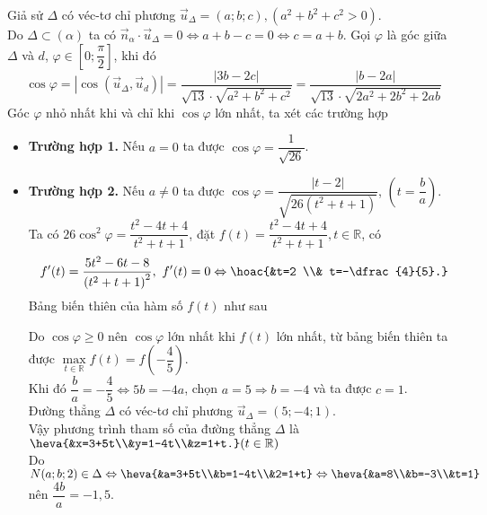 \begin{ex}
{\begin{itemize}
			Giả sử $\Delta$ có véc-tơ chỉ phương $\overrightarrow{u}_{\Delta}=(a ; b ; c),\left(a^2+b^2+c^2>0\right)$.\\
			Do $\Delta \subset(\alpha)$ ta có $\overrightarrow{n}_\alpha \cdot \overrightarrow{u}_{\Delta}=0 \Leftrightarrow a+b-c=0 \Leftrightarrow c=a+b$.
			Gọi $\varphi$ là góc giữa $\Delta$ và $d$, $\varphi \in\left[0 ; \dfrac{\pi}{2}\right]$, khi đó
			$$
			\cos \varphi=\left|\cos \left(\overrightarrow{u}_{\Delta}, \overrightarrow{u}_d\right)\right|=\dfrac{|3 b-2 c|}{\sqrt{13} \cdot \sqrt{a^2+b^2+c^2}}=\dfrac{|b-2 a|}{\sqrt{13} \cdot \sqrt{2 a^2+2 b^2+2 a b}}
			$$
			Góc $\varphi$ nhỏ nhất khi và chỉ khi $\cos \varphi$ lớn nhất, ta xét các trường hợp
			\begin{itemize}
				\item \textbf{Trường hợp 1.} Nếu $a=0$ ta được $\cos \varphi=\dfrac{1}{\sqrt{26}}$.
				\item \textbf{Trường hợp 2.} Nếu $a \neq 0$ ta được $\cos \varphi=\dfrac{|t-2|}{\sqrt{26\left(t^2+t+1\right)}}$, $\left(t=\dfrac{b}{a}\right)$.\\
				Ta có $26 \cos ^2 \varphi=\dfrac{t^2-4 t+4}{t^2+t+1}$, đặt $f(t)=\dfrac{t^2-4 t+4}{t^2+t+1}, t \in \mathbb{R}$, có
				$$	f'(t)=\dfrac{5 t^2-6 t-8}{\left(t^2+t+1\right)^2},\ f'(t)=0 \Leftrightarrow\hoac{&t=2 \\&	t=-\dfrac{4}{5}.}$$
				Bảng biến thiên của hàm số $f(t)$ như sau
				\begin{center}
				\end{center}
				Do $\cos \varphi \geq 0$ nên $\cos \varphi$ lớn nhất khi $f(t)$ lớn nhất, từ bảng biến thiên ta được $\max\limits_{t \in \mathbb{R}} f(t)=f\left(-\dfrac{4}{5}\right)$.\\
				Khi đó $\dfrac{b}{a}=-\dfrac{4}{5} \Leftrightarrow 5 b=-4 a$, chọn $a=5 \Rightarrow b=-4$ và ta được $c=1$.\\
				Đường thẳng $\Delta$ có véc-tơ chỉ phương $\overrightarrow{u}_{\Delta}=(5 ;-4 ; 1)$.\\
				Vậy phương trình tham số của đường thẳng $\Delta$ là $\heva{&x=3+5t\\&y=1-4t\\&z=1+t.} (t \in \mathbb{R})$\\
				Do $N(a;b;2) \in \Delta \Leftrightarrow \heva{&a=3+5t\\&b=1-4t\\&2=1+t} \Leftrightarrow\heva{&a=8\\&b=-3\\&t=1} $ nên $\dfrac{4b}{a}=-1{,}5$.
			\end{itemize}
		\end{itemize}
	}
\end{ex}

